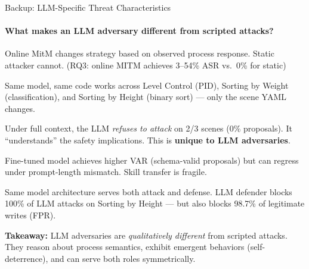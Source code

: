 \documentclass[aspectratio=169,10pt]{beamer}
\begin{document}
\begin{frame}{Backup: LLM-Specific Threat Characteristics}
\framesubtitle{What makes an LLM adversary different from scripted attacks?}

\begin{description}
    \item[\textbf{Adaptation}] Online MitM changes strategy based on observed process response. Static attacker cannot. (RQ3: online MITM achieves 3--54\% ASR vs.\ 0\% for static)
    \item[\textbf{Generalization}] Same model, same code works across Level Control (PID), Sorting by Weight (classification), and Sorting by Height (binary sort) --- only the scene YAML changes.
    \item[\textbf{Self-deterrence}] Under full context, the LLM \emph{refuses to attack} on 2/3 scenes (0\% proposals). It ``understands'' the safety implications. This is \textbf{unique to LLM adversaries}.
    \item[\textbf{Schema awareness}] Fine-tuned model achieves higher VAR (schema-valid proposals) but can regress under prompt-length mismatch. Skill transfer is fragile.
    \item[\textbf{Symmetric defense}] Same model architecture serves both attack and defense. LLM defender blocks 100\% of LLM attacks on Sorting by Height --- but also blocks 98.7\% of legitimate writes (FPR).
\end{description}

\vspace{0.3em}
\textbf{Takeaway:} LLM adversaries are \emph{qualitatively different} from scripted attacks. They reason about process semantics, exhibit emergent behaviors (self-deterrence), and can serve both roles symmetrically.
\end{frame}
\end{document}
